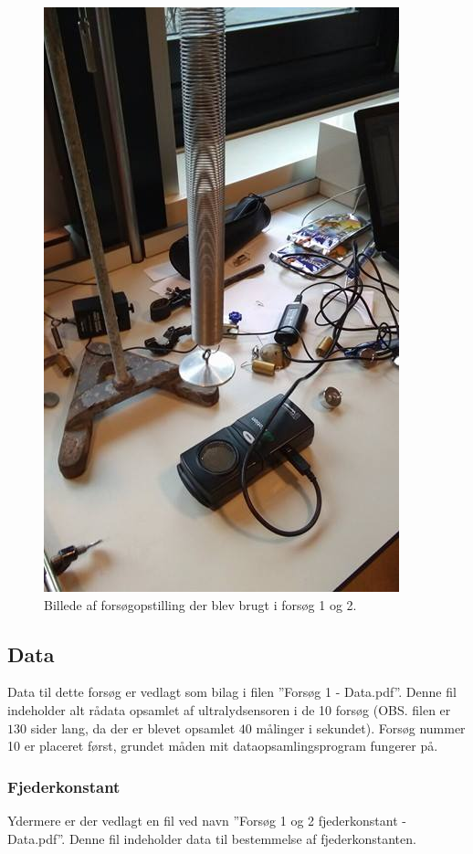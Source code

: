 \begin{figure}
\centering
\includegraphics[scale=0.4]{Figurer/Opstilling}
\caption{Billede af forsøgopstilling der blev brugt i forsøg 1 og 2.}
\end{figure}

\subsection{Data}\label{exp1: Data}


Data til dette forsøg er vedlagt som bilag i filen ''Forsøg 1 - Data.pdf''.
Denne fil indeholder alt rådata opsamlet af ultralydsensoren i de 10 forsøg (OBS. filen er $130$ sider lang, da der er blevet opsamlet $40$ målinger i sekundet). 
Forsøg nummer 10 er placeret først, grundet måden mit dataopsamlingsprogram fungerer på.

\subsubsection{Fjederkonstant}\label{exp1: Fjederkonstant}
Ydermere er der vedlagt en fil ved navn ''Forsøg 1 og 2 fjederkonstant - Data.pdf''.
Denne fil indeholder data til bestemmelse af fjederkonstanten. 

